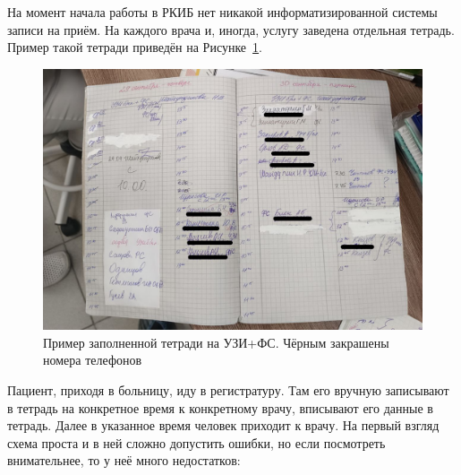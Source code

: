 \documentclass[a4paper,article]{article}
\begin{document}
        На момент начала работы в РКИБ нет никакой информатизированной системы записи на приём. На каждого врача и, иногда, услугу заведена отдельная тетрадь. Пример такой тетради приведён на Рисунке~\ref{fig:Тетрадь на УЗИ+ФС}.

        \begin{figure}[h]

            \centering

            \includegraphics[width=0.8\linewidth]{Пример заполненной тетради на УЗИ+ФС. Чёрным закрашены номера телефонов.png}

            \caption{\centering Пример заполненной тетради на УЗИ+ФС. Чёрным закрашены номера телефонов}

            \label{fig:Тетрадь на УЗИ+ФС}

        \end{figure}

        Пациент, приходя в больницу, иду в регистратуру. Там его вручную записывают в тетрадь на конкретное время к конкретному врачу, вписывают его данные в тетрадь. Далее в указанное время человек приходит к врачу.
        На первый взгляд схема проста и в ней сложно допустить ошибки, но если посмотреть внимательнее, то у неё много недостатков:
\end{document}
